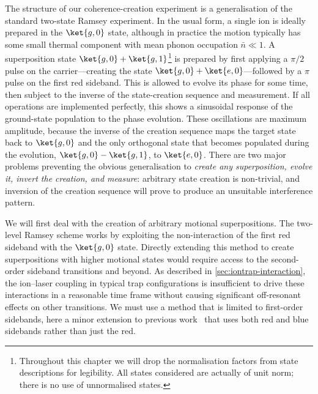 The structure of our coherence-creation experiment is a generalisation of the standard two-state Ramsey experiment.
In the usual form, a single ion is ideally prepared in the $\ket{g,0}$ state, although in practice the motion typically has some small thermal component with mean phonon occupation $\bar n \ll 1$.
A superposition state $\ket{g,0} + \ket{g,1}$\footnote{%
    Throughout this chapter we will drop the normalisation factors from state descriptions for legibility.
    All states considered are actually of unit norm; there is no use of unnormalised states.
} is prepared by first applying a $\pi/2$ pulse on the carrier---creating the state $\ket{g,0} + \ket{e,0}$---followed by a $\pi$ pulse on the first red sideband.
This is allowed to evolve its phase for some time, then subject to the inverse of the state-creation sequence and measurement.
If all operations are implemented perfectly, this shows a sinusoidal response of the ground-state population to the phase evolution.
These oscillations are maximum amplitude, because the inverse of the creation sequence maps the target state back to $\ket{g,0}$ and the only orthogonal state that becomes populated during the evolution, $\ket{g,0}-\ket{g,1}$, to $\ket{e,0}$.
There are two major problems preventing the obvious generalisation to \emph{create \emph{any} superposition, evolve it, invert the creation, and measure}: arbitrary state creation is non-trivial, and inversion of the creation sequence will prove to produce an unsuitable interference pattern.

We will first deal with the creation of arbitrary motional superpositions.
The two-level Ramsey scheme works by exploiting the non-interaction of the first red sideband with the $\ket{g,0}$ state.
Directly extending this method to create superpositions with higher motional states would require access to the second-order sideband transitions and beyond.
As described in \cref{sec:iontrap-interaction}, the ion--laser coupling in typical trap configurations is insufficient to drive these interactions in a reasonable time frame without causing significant off-resonant effects on other transitions.
We must use a method that is limited to first-order sidebands, here a minor extension to previous work~\cite{Gardiner1997,Ben-Kish2003} that uses both red and blue sidebands rather than just the red.

